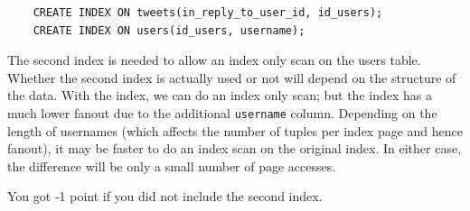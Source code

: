 \documentclass[12pt]{exam}
\theoremstyle{definition}
\begin{document}
\begin{questions}
\newpage
{}
\begin{solution}
    \begin{lstlisting}
    CREATE INDEX ON tweets(in_reply_to_user_id, id_users);
    CREATE INDEX ON users(id_users, username);
    \end{lstlisting}
    The second index is needed to allow an index only scan on the users table.
    Whether the second index is actually used or not will depend on the structure of the data.
    With the index, we can do an index only scan;
    but the index has a much lower fanout due to the additional \lstinline{username} column.
    Depending on the length of usernames (which affects the number of tuples per index page and hence fanout),
    it may be faster to do an index scan on the original index.
    In either case, the difference will be only a small number of page accesses.

    You got -1 point if you did not include the second index.
\end{solution}

\vspace{3in}
\end{questions}
\end{document}
